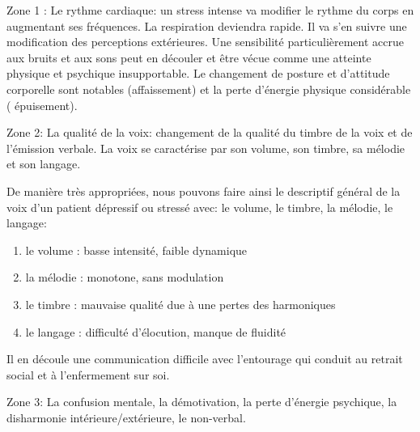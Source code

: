 Zone 1 :  Le rythme cardiaque: un stress intense va modifier le rythme
  du corps en augmentant ses fréquences. La respiration deviendra
  rapide. Il va s'en suivre une modification des perceptions
  extérieures. Une sensibilité particulièrement accrue aux bruits et
  aux sons peut en découler et être vécue comme une
  atteinte physique et psychique insupportable.
  Le changement de posture et d'attitude corporelle sont
notables (affaissement) et la perte d'énergie physique considérable ( épuisement).


 Zone 2: La qualité de la voix: changement de la qualité du timbre de la
 voix et de l'émission verbale.
  La voix se caractérise par son volume, son timbre, sa mélodie et son langage. 
 	
 	De manière très appropriées, nous pouvons faire ainsi le
        descriptif général de la voix d'un patient dépressif ou
        stressé avec: le volume, le timbre, la
        mélodie, le langage: 
 	\begin{enumerate}
 		\item le volume : basse intensité, faible dynamique
 		\item la mélodie : monotone, sans modulation
 		\item le timbre : mauvaise qualité due à une pertes des harmoniques
 		\item le langage : difficulté d'élocution, manque de fluidité
 	\end{enumerate}
        Il en découle une communication difficile avec l'entourage qui  conduit au retrait social et à l'enfermement sur soi.
        
Zone 3: La confusion mentale, la démotivation, la perte d'énergie
psychique, la disharmonie intérieure/extérieure, le non-verbal.



